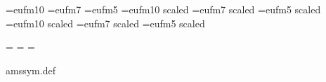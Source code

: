 
\ifcase\@ptsize
  \font\teneufm=eufm10
  \font\seveneufm=eufm7
  \font\fiveeufm=eufm5
\or
  \font\teneufm=eufm10   scaled \magstephalf
  \font\seveneufm=eufm7  scaled \magstephalf
  \font\fiveeufm=eufm5   scaled \magstephalf
\or
  \font\teneufm=eufm10   scaled 
  \font\seveneufm=eufm7  scaled 
  \font\fiveeufm=eufm5   scaled 
\fi


\newfam\eufmfam
\textfont\eufmfam=\teneufm
\scriptfont\eufmfam=\seveneufm
\scriptscriptfont\eufmfam=\fiveeufm
\def\frak#1{{\fam\eufmfam\relax#1}}
\let\goth\frak

\csname amssym.def\endcsname




